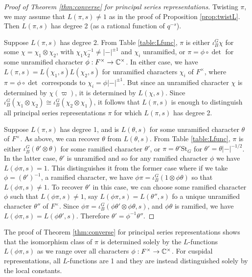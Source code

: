 \begin{proof}[Proof of Theorem \ref{thm:converse} for principal series representations]
    Twisting $\pi$, we may assume that $L(\pi,s) \neq 1$ as in the proof of Proposition \ref{prop:twistL}. Then $L(\pi,s)$ has degree 2 (as a rational function of $q^{-s}$). 

    Suppose $L(\pi,s)$ has degree 2. From Table \ref{table:Lfunc}, $\pi$ is either $\iota_B^G \chi$ for some $\chi=\chi_1 \otimes \chi_2$, with $\chi_1\chi_2^{-1} \neq |-|^{\pm 1}$ and $\chi_i$ unramified, or $\pi = \phi \circ \det$ for some unramified character $\phi :F^\times \to \mathbb{C}^\times$. In either case, we have $L(\pi,s)=L(\chi_1,s)L(\chi_2,s)$ for unramified characters $\chi_i$ of $F^\times$, where $\pi = \phi \circ \det$ corresponds to $\chi_i = \phi |-|^{\pm 1}$. But since an unramified character $\chi$ is determined by $\chi(\varpi)$, it is determined by $L(\chi,s)$. Since $\iota_B^G( \chi_1 \otimes \chi_2) \cong \iota_B^G (\chi_2 \otimes \chi_1)$, it follows that $L(\pi,s)$ is enough to distinguish all principal series representations $\pi$ for which $L(\pi,s)$ has degree 2.

    Suppose $L(\pi,s)$ has degree 1, and is $L(\theta,s)$ for some unramified character $\theta$ of $F^\times$. As above, we can recover $\theta$ from $L(\theta, s)$. From Table \ref{table:Lfunc}, $\pi$ is either $\iota_B^G (\theta' \otimes \theta)$ for some ramified character $\theta'$, or $\pi = \theta' \mathrm{St}_G$ for $\theta' = \theta|-|^{-1/2}$. In the latter case, $\theta'$ is unramified and so for any ramified character $\phi$ we have $L(\phi\pi,s)=1$. This distinguishes it from the former case where if we take $\phi = (\theta')^{-1}$, a ramified character, we have $\phi\pi = \iota_B^G (1 \otimes \phi\theta)$ so that $L(\phi\pi,s) \neq 1$. To recover $\theta'$ in this case, we can choose some ramified character $\phi$ such that $L(\phi\pi,s) \neq 1$, say $L(\phi\pi,s) = L(\theta'',s)$ fo a unique unramified character $\theta''$ of $F^\times$. Since $\phi\pi = \iota_B^G (\phi\theta' \otimes \phi\theta,s)$, and $\phi\theta$ is ramified, we have $L(\phi\pi,s) = L(\phi\theta',s)$. Therefore $\theta' = \phi^{-1}\theta''$.
\end{proof}

\begin{rem}
    The proof of Theorem \ref{thm:converse} for principal series representations shows that the isomorphism class of $\pi$ is determined solely by the $L$-functions $L(\phi\pi,s)$ as we range over all characters $\phi :F^\times \to \mathbb{C}^\times$. For cuspidal representations, all $L$-functions are 1 and they are instead distinguished solely by the local constants.
\end{rem}